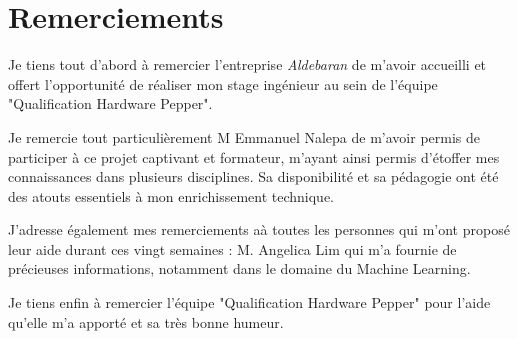 \chapter*{Remerciements}
\thispagestyle{fancy}
\label{Remerciements}

Je tiens tout d'abord à remercier l'entreprise \emph{Aldebaran} de m'avoir accueilli et offert l'opportunité de réaliser mon stage ingénieur au sein de l'équipe "Qualification Hardware Pepper".

Je remercie tout particulièrement M Emmanuel Nalepa de m'avoir permis de participer à ce projet captivant et formateur, m'ayant ainsi permis d'étoffer mes connaissances dans plusieurs disciplines.  Sa disponibilité et sa pédagogie ont été des atouts essentiels à mon enrichissement technique.

J’adresse également mes remerciements aà toutes les personnes qui m’ont proposé leur aide durant ces vingt semaines :
M. Angelica Lim qui m’a fournie de précieuses informations, notamment dans le domaine du Machine Learning.

Je tiens enfin à remercier l'équipe "Qualification Hardware Pepper" pour l'aide qu'elle m'a apporté et sa très bonne humeur.

